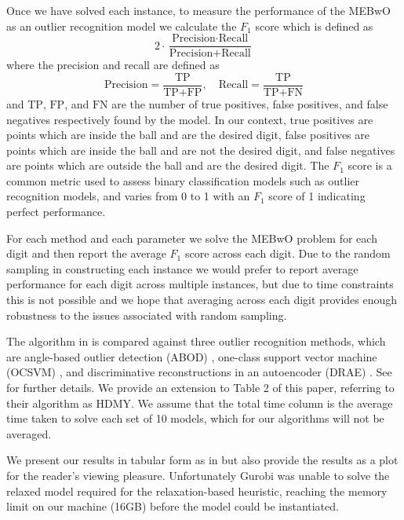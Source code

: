 \documentclass[11pt,twoside]{report}
\theoremstyle{definition}
\numberwithin{theorem}{section}
\numberwithin{definition}{section}
\numberwithin{lemma}{section}
\numberwithin{proposition}{section}
\numberwithin{equation}{section}
\numberwithin{figure}{section}
\begin{document}
Once we have solved each instance, to measure the performance of the MEBwO as an outlier recognition model we calculate the $F_1$ score which is defined as
\begin{equation*}
    2\cdot\frac{\text{Precision}\cdot\text{Recall}}{\text{Precision}+\text{Recall}}
\end{equation*}
where the precision and recall are defined as 
\begin{equation*}
    \text{Precision} = \frac{\text{TP}}{\text{TP} + \text{FP}},\quad \text{Recall} = \frac{\text{TP}}{\text{TP}+\text{FN}}
\end{equation*}
and $\text{TP}$, $\text{FP}$, and $\text{FN}$ are the number of true positives, false positives, and false negatives respectively found by the model. In our context, true positives are points which are inside the ball and are the desired digit, false positives are points which are inside the ball and are not the desired digit, and false negatives are points which are outside the ball and are the desired digit. The $F_1$ score is a common metric used to assess binary classification models such as outlier recognition models, and varies from 0 to 1 with an $F_1$ score of 1 indicating perfect performance.

For each method and each parameter we solve the MEBwO problem for each digit and then report the average $F_1$ score across each digit. Due to the random sampling in constructing each instance we would prefer to report average performance for each digit across multiple instances, but due to time constraints this is not possible and we hope that averaging across each digit provides enough robustness to the issues associated with random sampling.

The algorithm in \cite{huding} is compared against three outlier recognition methods, which are angle-based outlier detection (ABOD) \cite{abod}, one-class support vector machine (OCSVM) \cite{ocsvm}, and discriminative reconstructions in an autoencoder (DRAE) \cite{drae}. See \cite{huding} for further details. We provide an extension to Table 2 of this paper, referring to their algorithm as HDMY. We assume that the total time column is the average time taken to solve each set of 10 models, which for our algorithms will not be averaged.

We present our results in tabular form as in \cite{huding} but also provide the results as a plot for the reader's viewing pleasure. Unfortunately Gurobi was unable to solve the relaxed model required for the relaxation-based heuristic, reaching the memory limit on our machine (16GB) before the model could be instantiated.
\end{document}
